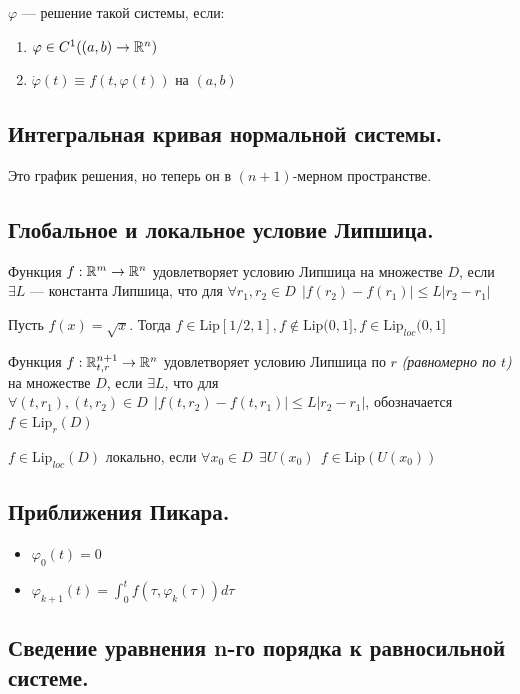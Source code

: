 \(\varphi\) --- решение такой системы, если:
\begin{enumerate}
    \item \(\varphi \in C^1((a, b) \to \mathbb{R}^n)\)
    \item \(\dot \varphi(t) \equiv f(t, \varphi(t))\) на \((a, b)\)
\end{enumerate}

\subsection*{Интегральная кривая нормальной системы.}

Это график решения, но теперь он в \((n + 1)\)-мерном пространстве.

\subsection*{Глобальное и локальное условие Липшица.}

Функция \(f : \mathbb{R}^m \to \mathbb{R}^n\) удовлетворяет условию Липшица на множестве \(D\), если \(\exists L\) --- константа Липшица, что для \(\forall r_1, r_2\in D \ \ |f(r_2) - f(r_1)| \leq L|r_2 - r_1|\)

\begin{example}
    Пусть \(f(x) = \sqrt{x}\). Тогда \(f\in \text{Lip}[1 / 2, 1], f\not\in \text{Lip}(0, 1], f\in \text{Lip}_{loc}(0, 1]\)
\end{example}

Функция \(f : \mathbb{R}^{n + 1}_{t, r} \to \mathbb{R}^n\) удовлетворяет условию Липшица по \(r\) \textit{(равномерно по \(t\))} на множестве \(D\), если \(\exists L\), что для \(\forall (t, r_1), (t, r_2)\in D \ \ |f(t, r_2) - f(t, r_1)| \leq L|r_2 - r_1|\), обозначается \(f\in \text{Lip}_r(D)\)

\(f \in \text{Lip}_{loc}(D)\) локально, если \(\forall x_0\in D \ \ \exists U(x_0) \ \ f\in \text{Lip}(U(x_0))\)

\subsection*{Приближения Пикара.}

\begin{itemize}
    \item \(\varphi_0(t) = 0\)
    \item \(\varphi_{k + 1}(t) = \int_0^t f(\tau, \varphi_k(\tau))d\tau\)
\end{itemize}

\subsection*{Сведение уравнения n-го порядка к равносильной системе.}

